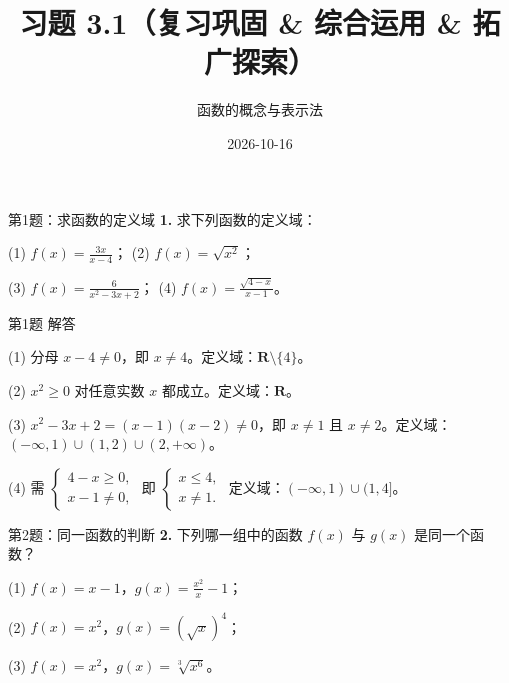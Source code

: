 \documentclass[10pt,aspectratio=169,serif]{beamer}
\title[习题3.1]{习题 3.1（复习巩固 \& 综合运用 \& 拓广探索）}
\subtitle{函数的概念与表示法}
\author{}
\institute{}
\date{2026-10-16}
\begin{document}
\begin{frame}
  \titlepage
\end{frame}

\begin{frame}[t]{第1题：求函数的定义域}
\textbf{1.} 求下列函数的定义域：

\vspace{0.8em}
(1) $\displaystyle f(x)=\frac{3x}{x-4}$；\hfil
(2) $\displaystyle f(x)=\sqrt{x^2}$；

\vspace{1em}
(3) $\displaystyle f(x)=\frac{6}{x^2-3x+2}$；\hfil
(4) $\displaystyle f(x)=\frac{\sqrt{4-x}}{x-1}$。
\end{frame}

\begin{frame}[t]{第1题 解答}
\begin{tcolorbox}[colback=orange!10,colframe=orange,title=\textbf{解}]
(1) 分母 $x-4\neq 0$，即 $x\neq 4$。定义域：$\mathbf{R}\setminus\{4\}$。

\vspace{1em}
(2) $x^2\ge 0$ 对任意实数 $x$ 都成立。定义域：$\mathbf{R}$。

\vspace{1em}
(3) $x^2-3x+2=(x-1)(x-2)\neq 0$，即 $x\neq 1$ 且 $x\neq 2$。定义域：$(-\infty,1)\cup(1,2)\cup(2,+\infty)$。

\vspace{1em}
(4) 需 $\begin{cases}4-x\ge 0,\\ x-1\neq 0,\end{cases}$ 即 $\begin{cases}x\le 4,\\ x\neq 1.\end{cases}$
定义域：$(-\infty,1)\cup(1,4]$。
\end{tcolorbox}
\end{frame}

\begin{frame}[t]{第2题：同一函数的判断}
\textbf{2.} 下列哪一组中的函数 $f(x)$ 与 $g(x)$ 是同一个函数？

\vspace{0.8em}
(1) $f(x)=x-1$，$\displaystyle g(x)=\frac{x^2}{x}-1$；

\vspace{0.8em}
(2) $f(x)=x^2$，$g(x)=(\sqrt{x})^4$；

\vspace{0.8em}
(3) $f(x)=x^2$，$\displaystyle g(x)=\sqrt[3]{x^6}$。
\end{frame}
\end{document}
